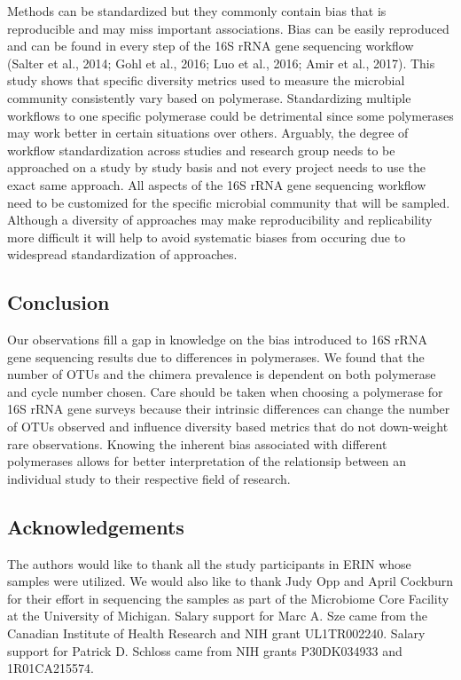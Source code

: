 \documentclass[12pt,]{article}
\begin{document}
Methods can be standardized but they commonly contain bias that is
reproducible and may miss important associations. Bias can be easily
reproduced and can be found in every step of the 16S rRNA gene
sequencing workflow (Salter et al., 2014; Gohl et al., 2016; Luo et al.,
2016; Amir et al., 2017). This study shows that specific diversity
metrics used to measure the microbial community consistently vary based
on polymerase. Standardizing multiple workflows to one specific
polymerase could be detrimental since some polymerases may work better
in certain situations over others. Arguably, the degree of workflow
standardization across studies and research group needs to be approached
on a study by study basis and not every project needs to use the exact
same approach. All aspects of the 16S rRNA gene sequencing workflow need
to be customized for the specific microbial community that will be
sampled. Although a diversity of approaches may make reproducibility and
replicability more difficult it will help to avoid systematic biases
from occuring due to widespread standardization of approaches.

\newpage

\subsection{Conclusion}\label{conclusion}

Our observations fill a gap in knowledge on the bias introduced to 16S
rRNA gene sequencing results due to differences in polymerases. We found
that the number of OTUs and the chimera prevalence is dependent on both
polymerase and cycle number chosen. Care should be taken when choosing a
polymerase for 16S rRNA gene surveys because their intrinsic differences
can change the number of OTUs observed and influence diversity based
metrics that do not down-weight rare observations. Knowing the inherent
bias associated with different polymerases allows for better
interpretation of the relationsip between an individual study to their
respective field of research.

\newpage

\subsection{Acknowledgements}\label{acknowledgements}

The authors would like to thank all the study participants in ERIN whose
samples were utilized. We would also like to thank Judy Opp and April
Cockburn for their effort in sequencing the samples as part of the
Microbiome Core Facility at the University of Michigan. Salary support
for Marc A. Sze came from the Canadian Institute of Health Research and
NIH grant UL1TR002240. Salary support for Patrick D. Schloss came from
NIH grants P30DK034933 and 1R01CA215574.
\end{document}
